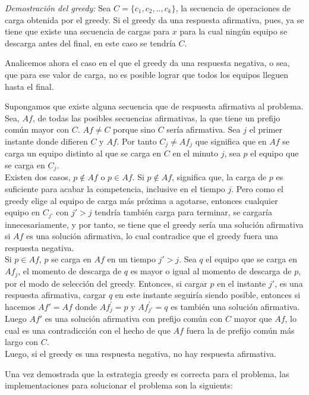 \documentclass{article}
\begin{document}
\textit{Demostraci\'on del greedy:} Sea $C = \{c_1, c_2, ..,c_k\}$, la secuencia de operaciones de carga obtenida por el greedy.
Si el greedy da una respuesta afirmativa, pues, ya se tiene que existe una secuencia de cargas para $x$ para la cual ning\'un equipo se descarga antes del final, en este caso se tendr\'ia $C$.

Analicemos ahora el caso en el que el greedy da una respuesta negativa, o sea, que para ese valor de carga, no es posible lograr que todos los equipos lleguen hasta el final.

Supongamos que existe alguna secuencia que de respuesta afirmativa al problema. Sea, $Af$, de todas las posibles secuencias afirmativas, la que tiene un prefijo com\'un mayor con $C$.
$Af\neq C$ porque sino $C$ ser\'ia afirmativa.
Sea $j$ el primer instante donde difieren $C$ y $Af$. Por tanto $C_j\neq Af_j$ que significa que en $Af$ se carga un equipo distinto al que se carga en $C$ en el minuto $j$, sea $p$ el equipo que se carga en $C_j$.\\

Existen dos casos, $p\notin Af$ o $p\in Af$. Si $p\notin Af$, significa que, la carga de $p$ es suficiente para acabar la competencia, inclusive en el tiempo $j$. Pero como el greedy elige al equipo de carga m\'as pr\'oxima a agotarse, entonces cualquier equipo en $C_{j'}$ con $j'>j$ tendr\'ia tambi\'en carga para terminar, se cargar\'ia innecesariamente, y por tanto, se tiene que el greedy ser\'ia una soluci\'on afirmativa si $Af$ es una soluci\'on afirmativa, lo cual contradice que el greedy fuera una respuesta negativa.\\
Si $p\in Af$, $p$ se carga en $Af$ en un tiempo $j'>j$. Sea $q$ el equipo que se carga en $Af_j$, el momento de descarga de $q$ es mayor o igual al momento de descarga de $p$, por el modo de selecci\'on del greedy. Entonces, si cargar $p$ en el instante $j'$, es una respuesta afirmativa, cargar $q$ en este instante seguir\'ia siendo posible, entonces si hacemos $Af'=Af$ donde $Af^{'}_{j} = p$ y $Af^{'}_{j'}=q$ es tambi\'en una soluci\'on afirmativa. Luego $Af'$ es una soluci\'on afirmativa con prefijo com\'un con $C$ mayor que $Af$, lo cual es una contradicci\'on con el hecho de que $Af$ fuera la de prefijo com\'un m\'as largo con $C$.\\

Luego, si el greedy es una respuesta negativa, no hay respuesta afirmativa.

Una vez demostrada que la estrategia greedy es correcta para el problema, las implementaciones para solucionar el problema son la siguients:\\
\end{document}
